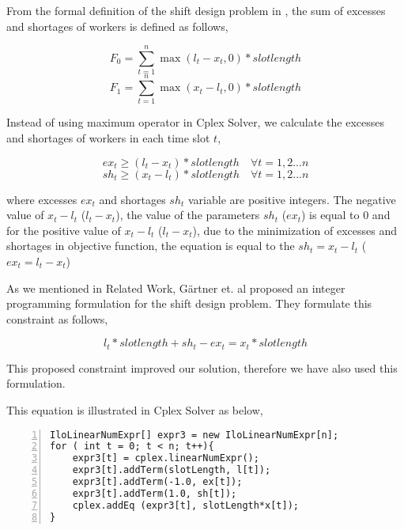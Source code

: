 From the formal definition of the shift design problem in \cite{li:2004:musliu}, the sum of excesses and shortages of workers is defined as follows,

\begin{equation}
F_0 = \sum_{t=1}^n \max (l_t - x_t, 0) * slotlength
\end{equation}
\begin{equation}
F_1 = \sum_{t=1}^n \max (x_t - l_t, 0) * slotlength
\end{equation}

Instead of using maximum operator in Cplex Solver, we calculate the excesses and shortages of workers in each time slot $t$,

\begin{equation}
ex_t \ge (l_t - x_t) * slotlength  \quad  \forall t = 1,2 ...n
\end{equation}
\begin{equation}
sh_t \ge (x_t - l_t) * slotlength \quad  \forall t = 1,2 ...n
\end{equation}

where excesses $ex_t$ and shortages $sh_t$ variable are positive integers. The negative value of $x_t - l_t$ ($l_t - x_t$), the value of the parameters  $sh_t$ ($ex_t$) is equal to 0 and for the positive value of $x_t - l_t$ ($l_t - x_t$), due to the minimization of excesses and shortages in objective function, the equation is equal to the $sh_t =x_t - l_t$ ($ex_t = l_t - x_t$) 


As we mentioned in Related Work, G\"artner et. al \cite{li:2006:gaertner} proposed an integer programming formulation for the shift design problem. They formulate this constraint as follows,
 
\begin{equation}
l_t  * slotlength  + sh_t - ex_t = x_t  * slotlength 
\end{equation}

This proposed constraint improved our solution, therefore we have also used this formulation.

This equation is illustrated in Cplex Solver as below,

\begin{lstlisting}[frame=single, numbers=left]
IloLinearNumExpr[] expr3 = new IloLinearNumExpr[n];
for ( int t = 0; t < n; t++){
    expr3[t] = cplex.linearNumExpr();
    expr3[t].addTerm(slotLength, l[t]);
    expr3[t].addTerm(-1.0, ex[t]);
    expr3[t].addTerm(1.0, sh[t]);
    cplex.addEq (expr3[t], slotLength*x[t]);
}
\end{lstlisting}

